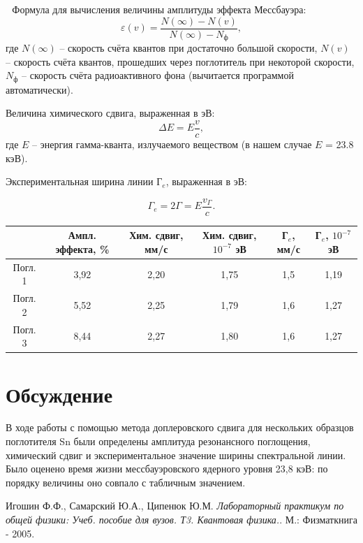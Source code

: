 \documentclass[a4paper,12pt]{article}
\theoremstyle{definition}
\begin{document}
\newpage
$ $
\newpage
$ $
Формула для вычисления величины амплитуды эффекта Мессбауэра:
$$
\varepsilon(v) = \frac{N(\infty) - N(v)}{N(\infty) - N_\text{ф}},
$$
где $N(\infty)$ -- скорость счёта квантов при достаточно большой скорости, $N(v)$ -- скорость счёта квантов, прошедших через поглотитель при некоторой скорости, $N_\text{ф}$ -- скорость счёта радиоактивного фона (вычитается программой автоматически).

Величина химического сдвига, выраженная в эВ:
$$
\Delta E = E \frac{v}{c},
$$
где $E$ -- энергия гамма-кванта, излучаемого веществом (в нашем случае $E$ = 23.8 кэВ).

Экспериментальная ширина линии Г$_e$, выраженная в эВ:

$$
\Gamma_e = 2 \Gamma = E \frac{v_\Gamma}{c}.
$$

\begin{table}[h!]
\begin{tabular}{|c|c|c|c|c|c|}
\hline
              & Ампл. эффекта, \% & Хим. сдвиг, мм/с & Хим. сдвиг, $10^{-7}$ эВ & Г$_e$, мм/с & Г$_e$, $10^{-7}$ эВ \\ \hline
Погл. 1 &      3,92                 &   2,20               &      1,75          &      1,5       &     1,19      \\ \hline
Погл. 2 &      5,52                 &   2,25               &      1,79          &      1,6       &     1,27      \\ \hline
Погл. 3 &      8,44                 &   2,27               &      1,80          &      1,6       &     1,27      \\ \hline
\end{tabular}
\end{table}

\section*{Обсуждение}
В ходе работы с помощью метода доплеровского сдвига для нескольких образцов поглотителя Sn были определены амплитуда резонансного поглощения, химический сдвиг и экспериментальное значение ширины спектральной линии. Было оценено время жизни мессбауэровского ядерного уровня 23,8 кэВ: по порядку величины оно совпало с табличным значением.

\begin{thebibliography}{9}
Игошин Ф.Ф., Самарский Ю.А., Ципенюк Ю.М.
\textit{Лабораторный практикум по общей физики: Учеб. пособие для вузов. Т3. Квантовая физика.}. 
М.: Физматкнига - 2005.
\end{thebibliography}
\end{document}
